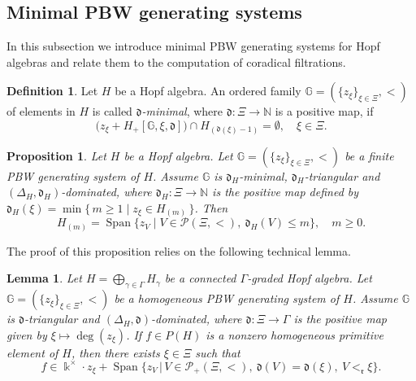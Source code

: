 \documentclass{article}
\theoremstyle{plain}
\newtheorem{prop}[thm]{Proposition}
\newtheorem{lemma}[thm]{Lemma}
\theoremstyle{definition}
\newtheorem{definition}[thm]{Definition}
\numberwithin{equation}{section}
\DeclareMathOperator{\Span}{Span}
\newcommand{\GG}{\mathbb{G}}
\newcommand{\dd}{\mathfrak{d}}
\newcommand{\rr}{\mathfrak{r}}
\begin{document}
	\subsection{Minimal PBW generating systems}
	
	In this subsection we introduce minimal PBW generating systems for Hopf algebras and relate them to the computation of coradical filtrations.
	
	\begin{definition}
		Let $H$ be a  Hopf algebra. An ordered family $\GG=(\{z_{\xi}\}_{\xi\in \Xi},<)$ of elements in $H$ is called \emph{$\dd$-minimal}, where $\dd\colon \Xi\to \mathbb{N}$ is a positive map, if
		\[
		\bigl( z_{\xi} + H_{+}[\GG, \xi,\dd] \bigr) \cap H_{(\dd(\xi)-1)} = \emptyset, \quad \xi \in \Xi.
		\]
	\end{definition}
	
	\begin{prop}\label{coradical filtration}
		Let $H$ be a Hopf algebra. Let $\GG=(\{z_{\xi}\}_{\xi\in \Xi},<)$ be a finite PBW generating system of $H$. Assume $\GG$ is $\dd_{H}$-minimal, $\dd_{H}$-triangular and $(\Delta_{H},\dd_{H})$-dominated, where $\dd_{H}\colon\Xi \to \mathbb{N}$ is the positive map defined by $\dd_{H}(\xi)=\min\{\, m \geq 1 \mid z_{\xi}\in H_{(m)}\,\}$. Then
		\[
		H_{(m)} =\Span\{z_{V} \mid V\in \mathcal{P}(\Xi,<), ~ \dd_{H}(V)\leq m\}, \quad m\geq 0.
		\]
	\end{prop}
	
	The proof of this proposition relies on the following technical lemma.
	
	\begin{lemma}\label{primitive-element}
		Let $H=\bigoplus_{\gamma\in \Gamma}H_{\gamma}$ be a connected $\Gamma$-graded Hopf algebra. Let $\GG=(\{z_{\xi}\}_{\xi\in \Xi},<)$ be a homogeneous PBW generating system of $H$. Assume $\GG$ is $\dd$-triangular and $(\Delta_{H},\dd)$-dominated, where $\dd\colon \Xi\to \Gamma$ is the positive map given by $\xi\mapsto \deg(z_{\xi})$. If $f\in P(H)$ is a nonzero homogeneous primitive element of $H$, then there exists $\xi\in \Xi$ such that
		\[
		f\in \Bbbk^{\times} \cdot z_{\xi} + \Span\bigl\{z_{V}\,\big|\, V\in \mathcal{P}_{+}(\Xi,<), ~ \dd(V) =\dd(\xi), ~ V<_{\rr}\xi \bigr\}.
		\]
	\end{lemma}
	
\end{document}
